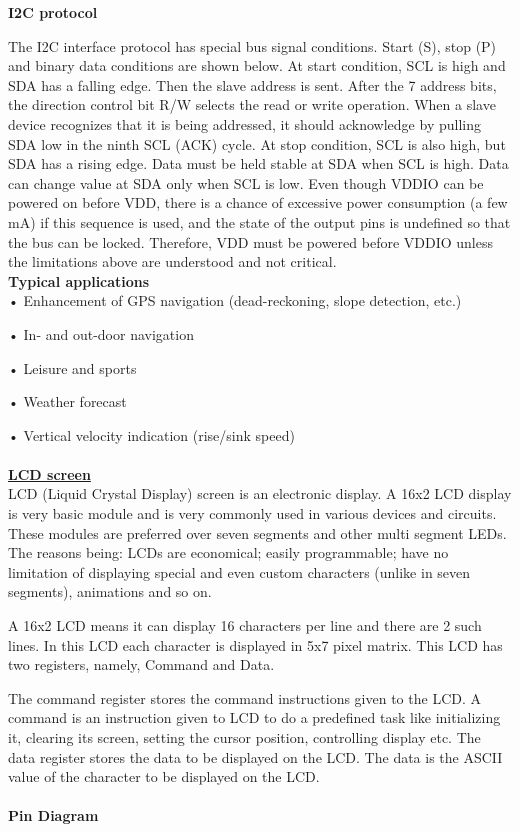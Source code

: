 \documentclass[11pt]{report}
\begin{document}
	 \textbf{\textbf{I2C protocol}} 
	 
	 The I2C interface protocol has special bus signal conditions. Start (S), stop (P) and binary data conditions are shown below. At start condition, SCL is high and SDA has a falling edge. Then the slave address is sent. After the 7 address bits, the direction control bit R/W selects the read or write operation. When a slave device recognizes that it is being addressed, it should acknowledge by pulling SDA low in the ninth SCL (ACK) cycle. At stop condition, SCL is also high, but SDA has a rising edge. Data must be held stable at SDA when SCL is high. Data can change value at SDA only when SCL is low. Even though VDDIO can be powered on before VDD, there is a chance of excessive power consumption (a few mA) if this sequence is used, and the state of the output pins is undefined so that the bus can be locked. Therefore, VDD must be powered before VDDIO unless the limitations above are understood and not critical.
	 \\
	 
	\textbf{Typical applications}
	\\
	 	 
	 •	Enhancement of GPS navigation (dead-reckoning, slope detection, etc.) 
	 
	 •	In- and out-door navigation 
	 
	 •	Leisure and sports
	 
	 •	Weather forecast 
	 
	 •	Vertical velocity indication (rise/sink speed)\\\\
	 
	 \underline{{\LARGE \textbf{LCD screen}}}\\
	 
	 LCD (Liquid Crystal Display) screen is an electronic display. A 16x2 LCD display is very basic module and is very commonly used in various devices and circuits. These modules are preferred over seven segments and other multi segment LEDs. The reasons being: LCDs are economical; easily programmable; have no limitation of displaying special and even custom characters (unlike in seven segments), animations and so on.
	 
	 A 16x2 LCD means it can display 16 characters per line and there are 2 such lines. In this LCD each character is displayed in 5x7 pixel matrix. This LCD has two registers, namely, Command and Data.
	 
	 The command register stores the command instructions given to the LCD. A command is an instruction given to LCD to do a predefined task like initializing it, clearing its screen, setting the cursor position, controlling display etc. The data register stores the data to be displayed on the LCD. The data is the ASCII value of the character to be displayed on the LCD. 
	 \\\\
	 \textbf{Pin Diagram}\\
	 
\end{document}
